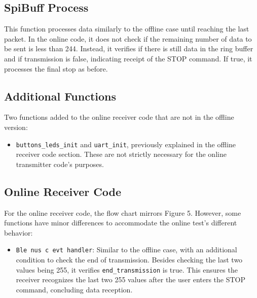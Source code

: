 \documentclass{Configuration_Files/PoliMi3i_thesis}
\begin{document}
\subsection*{SpiBuff Process}
This function processes data similarly to the offline case until reaching the last packet. In the online code, it does not check if the remaining number of data to be sent is less than 244. Instead, it verifies if there is still data in the ring buffer and if transmission is false, indicating receipt of the STOP command. If true, it processes the final stop as before.

\subsection*{Additional Functions}
Two functions added to the online receiver code that are not in the offline version:
\begin{itemize}
    \item \texttt{buttons\_leds\_init} and \texttt{uart\_init}, previously explained in the offline receiver code section. These are not strictly necessary for the online transmitter code's purposes.
\end{itemize}

\subsection*{Online Receiver Code}
For the online receiver code, the flow chart mirrors Figure 5. However, some functions have minor differences to accommodate the online test's different behavior:
\begin{itemize}
    \item \texttt{Ble nus c evt handler}: Similar to the offline case, with an additional condition to check the end of transmission. Besides checking the last two values being 255, it verifies \texttt{end\_transmission} is true. This ensures the receiver recognizes the last two 255 values after the user enters the STOP command, concluding data reception.
\end{itemize}
\end{document}
